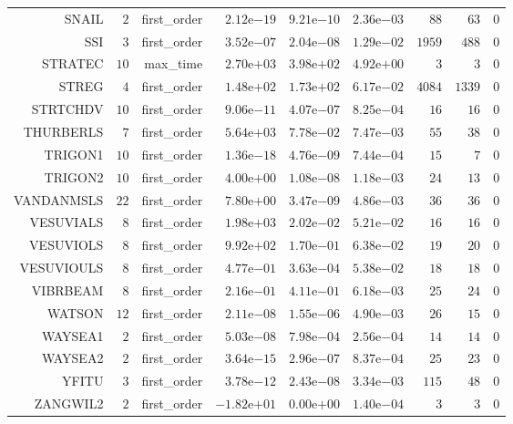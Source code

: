 \begin{longtable}{rrrrrrrrr}
SNAIL & \(     2\) & first\_order & \( 2.12\)e\(-19\) & \( 9.21\)e\(-10\) & \( 2.36\)e\(-03\) & \(    88\) & \(    63\) & \(     0\) \\
SSI & \(     3\) & first\_order & \( 3.52\)e\(-07\) & \( 2.04\)e\(-08\) & \( 1.29\)e\(-02\) & \(  1959\) & \(   488\) & \(     0\) \\
STRATEC & \(    10\) & max\_time & \( 2.70\)e\(+03\) & \( 3.98\)e\(+02\) & \( 4.92\)e\(+00\) & \(     3\) & \(     3\) & \(     0\) \\
STREG & \(     4\) & first\_order & \( 1.48\)e\(+02\) & \( 1.73\)e\(+02\) & \( 6.17\)e\(-02\) & \(  4084\) & \(  1339\) & \(     0\) \\
STRTCHDV & \(    10\) & first\_order & \( 9.06\)e\(-11\) & \( 4.07\)e\(-07\) & \( 8.25\)e\(-04\) & \(    16\) & \(    16\) & \(     0\) \\
THURBERLS & \(     7\) & first\_order & \( 5.64\)e\(+03\) & \( 7.78\)e\(-02\) & \( 7.47\)e\(-03\) & \(    55\) & \(    38\) & \(     0\) \\
TRIGON1 & \(    10\) & first\_order & \( 1.36\)e\(-18\) & \( 4.76\)e\(-09\) & \( 7.44\)e\(-04\) & \(    15\) & \(     7\) & \(     0\) \\
TRIGON2 & \(    10\) & first\_order & \( 4.00\)e\(+00\) & \( 1.08\)e\(-08\) & \( 1.18\)e\(-03\) & \(    24\) & \(    13\) & \(     0\) \\
VANDANMSLS & \(    22\) & first\_order & \( 7.80\)e\(+00\) & \( 3.47\)e\(-09\) & \( 4.86\)e\(-03\) & \(    36\) & \(    36\) & \(     0\) \\
VESUVIALS & \(     8\) & first\_order & \( 1.98\)e\(+03\) & \( 2.02\)e\(-02\) & \( 5.21\)e\(-02\) & \(    16\) & \(    16\) & \(     0\) \\
VESUVIOLS & \(     8\) & first\_order & \( 9.92\)e\(+02\) & \( 1.70\)e\(-01\) & \( 6.38\)e\(-02\) & \(    19\) & \(    20\) & \(     0\) \\
VESUVIOULS & \(     8\) & first\_order & \( 4.77\)e\(-01\) & \( 3.63\)e\(-04\) & \( 5.38\)e\(-02\) & \(    18\) & \(    18\) & \(     0\) \\
VIBRBEAM & \(     8\) & first\_order & \( 2.16\)e\(-01\) & \( 4.11\)e\(-01\) & \( 6.18\)e\(-03\) & \(    25\) & \(    24\) & \(     0\) \\
WATSON & \(    12\) & first\_order & \( 2.11\)e\(-08\) & \( 1.55\)e\(-06\) & \( 4.90\)e\(-03\) & \(    26\) & \(    15\) & \(     0\) \\
WAYSEA1 & \(     2\) & first\_order & \( 5.03\)e\(-08\) & \( 7.98\)e\(-04\) & \( 2.56\)e\(-04\) & \(    14\) & \(    14\) & \(     0\) \\
WAYSEA2 & \(     2\) & first\_order & \( 3.64\)e\(-15\) & \( 2.96\)e\(-07\) & \( 8.37\)e\(-04\) & \(    25\) & \(    23\) & \(     0\) \\
YFITU & \(     3\) & first\_order & \( 3.78\)e\(-12\) & \( 2.43\)e\(-08\) & \( 3.34\)e\(-03\) & \(   115\) & \(    48\) & \(     0\) \\
ZANGWIL2 & \(     2\) & first\_order & \(-1.82\)e\(+01\) & \( 0.00\)e\(+00\) & \( 1.40\)e\(-04\) & \(     3\) & \(     3\) & \(     0\) \\\hline
\end{longtable}
